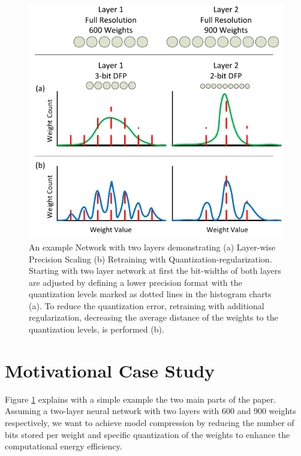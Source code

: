 \begin{figure}[ht!]
\includegraphics[width=\columnwidth]{img/intro2.pdf}
\caption{An example Network with two layers demonstrating (a) Layer-wise Precision Scaling (b) Retraining with Quantization-regularization. Starting with two layer network at first the bit-widths of both layers are adjusted by defining a lower precision format with the quantization levels marked as dotted lines in the histogram charts (a). To reduce the quantization error, retraining with additional regularization, decreasing the average distance of the weights to the quantization levels, is performed (b).}\label{fig:intro}
\end{figure}


\section{Motivational Case Study}
Figure \ref{fig:intro} explains with a simple example the two main parts of the paper. Assuming a two-layer neural network with two layers with 600 and 900 weights respectively, we want to achieve model compression by reducing the number of bits stored per weight and specific quantization of the weights to enhance the computational energy efficiency. 

